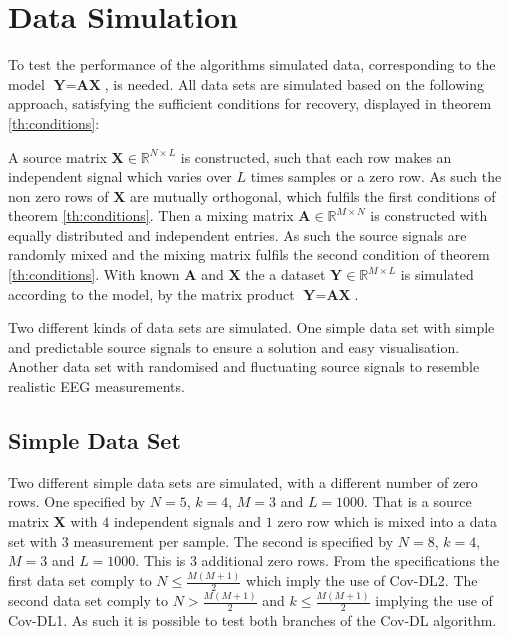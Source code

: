 \section{Data Simulation}\label{sec:dataset}
To test the performance of the algorithms simulated data, corresponding to the model $\textbf{Y}=\textbf{A}\textbf{X}$, is needed. All data sets are simulated based on the following approach, satisfying the sufficient conditions for recovery, displayed in theorem \ref{th:conditions}:
 
A source matrix $\textbf{X}\in \mathbb{R}^{N\times L}$ is constructed, such that each row makes an independent signal which varies over $L$ times samples or a zero row. As such the non zero rows of $\textbf{X}$ are mutually orthogonal, which fulfils the first conditions of theorem \ref{th:conditions}.   
Then a mixing matrix $\textbf{A}\in \mathbb{R}^{M\times N}$ is constructed with equally distributed and independent entries. As such the source signals are randomly mixed and the mixing matrix fulfils the second condition of theorem \ref{th:conditions}.
With known $\textbf{A}$ and $\textbf{X}$ the a dataset $\textbf{Y}\in \mathbb{R}^{M\times L}$ is simulated according to the model, by the matrix product $\textbf{Y}= \textbf{AX}$.  

Two different kinds of data sets are simulated.
One simple data set with simple and predictable source signals to ensure a solution and easy visualisation.
Another data set with randomised and fluctuating source signals to resemble realistic EEG measurements.

\subsection{Simple Data Set}\label{subseg_simpledata}
Two different simple data sets are simulated, with a different number of zero rows. 
One specified by $N = 5$, $k=4$, $M = 3$ and $L = 1000$. That is a source matrix $\textbf{X}$ with $4$ independent signals and $1$ zero row which is mixed into a data set with $3$ measurement per sample.  
The second is specified by $N = 8$, $k=4$, $M = 3$ and $L = 1000$. This is 3 additional zero rows.
From the specifications the first data set comply to $N \leq \frac{M(M+1)}{2}$ which imply the use of Cov-DL2.
The second data set comply to $N > \frac{M(M+1)}{2}$ and $k \leq \frac{M(M+1)}{2}$ implying the use of Cov-DL1. As such it is possible to test both branches of the Cov-DL algorithm. 
     
